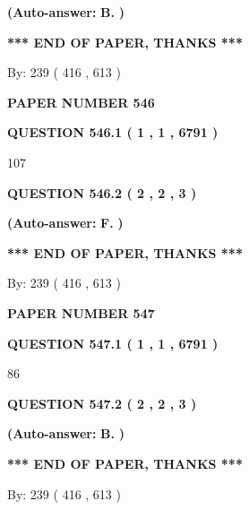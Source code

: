\documentclass{ctexart}
\begin{document}
 
{\textbf{(Auto-answer:}}
{\textbf{\large{
B.}}}
{\textbf{)}}
 
 
   
   
   
   
\vspace{1.0in} 
{\textbf{\large{ *** END OF PAPER, THANKS *** }}} 
   
   
\hspace{1.0in} By: 
 239 ( 416 ,  613 )
   
   
   
   
\newpage 
\setcounter{page}{ 
   546001 } 
   
   
 {\textbf{ \Large{ PAPER NUMBER  546  }}}
   
   
   
   
  
  
{\textbf{\large{QUESTION
546.1 
 ( 1 , 1 , 6791 )
}}}

107
  
  
{\textbf{\large{QUESTION
546.2 
 ( 2 , 2 , 3 )
}}}
 
 
{\textbf{(Auto-answer:}}
{\textbf{\large{
F.}}}
{\textbf{)}}
 
 
   
   
   
   
\vspace{1.0in} 
{\textbf{\large{ *** END OF PAPER, THANKS *** }}} 
   
   
\hspace{1.0in} By: 
 239 ( 416 ,  613 )
   
   
   
   
\newpage 
\setcounter{page}{ 
   547001 } 
   
   
 {\textbf{ \Large{ PAPER NUMBER  547  }}}
   
   
   
   
  
  
{\textbf{\large{QUESTION
547.1 
 ( 1 , 1 , 6791 )
}}}

86
  
  
{\textbf{\large{QUESTION
547.2 
 ( 2 , 2 , 3 )
}}}
 
 
{\textbf{(Auto-answer:}}
{\textbf{\large{
B.}}}
{\textbf{)}}
 
 
   
   
   
   
\vspace{1.0in} 
{\textbf{\large{ *** END OF PAPER, THANKS *** }}} 
   
   
\hspace{1.0in} By: 
 239 ( 416 ,  613 )
   
   
   
\end{document}
